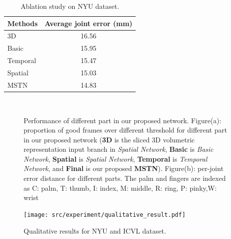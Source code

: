 \documentclass[journal,comsoc]{IEEEtran}
\let\MYoriglatexcaption\caption
\renewcommand{\caption}[2][\relax]{\MYoriglatexcaption[#2]{#2}}
\begin{document}
\begin{table}[htbp]
  \centering
  \caption{Ablation study on NYU dataset.}
    \begin{tabular}{|l|c|}
    \hline
    Methods & \multicolumn{1}{l}{Average joint error (mm)} \\
    \hline
    3D & 16.56 \\
    Basic & 15.95 \\
    Temporal & 15.47 \\
    Spatial & 15.03 \\
    MSTN & 14.83 \\
    \hline
    \end{tabular}%
  \label{tab:ablation NYU}%
\end{table}%

\begin{figure}[htbp]\footnotesize
\centering
    \\
    \caption{Performance of different part in our proposed network. Figure(a): proportion of good frames over
    different threshold for different part in our  proposed network (\textbf{3D} is the sliced 3D volumetric
    representation input branch in \emph{Spatial Network}, \textbf{Basic} is \emph{Basic Network}, \textbf{
    Spatial} is \emph{Spatial Network}, \textbf{Temporal} is \emph{Temporal Network}, and \textbf{Final}
    is our proposed \textbf{MSTN}). Figure(b): per-joint error distance for different parts. The palm and fingers
    are indexed as C: palm, T: thumb, I: index, M: middle, R: ring, P: pinky,W: wrist}
    \label{fig:result ablation}
\end{figure}

\begin{figure}[t]\footnotesize
\centering
    \texttt{[image: src/experiment/qualitative\_result.pdf]}
    \caption{Qualitative results for NYU and ICVL dataset.}
\label{fig:qualitative result}
\end{figure}
\end{document}
